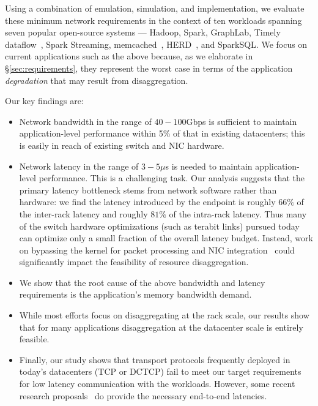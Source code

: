 Using a combination of emulation, simulation, and implementation, we evaluate these minimum network requirements in the context of ten workloads spanning seven popular open-source systems --- Hadoop, Spark, GraphLab, Timely dataflow~\cite{timely-dataflow, timely-dataflow1}, Spark Streaming, memcached~\cite{memcached}, HERD~\cite{herd}, and SparkSQL\@. 
We focus on current applications such as the above because, as we elaborate in \S\ref{sec:requirements}, they represent the worst case in terms of the application \emph{degradation} that may result from disaggregation. 

\noindent Our key findings are:
\vspace{-0.5em}
\begin{itemize}[leftmargin=*]
\itemsep0em
	\item Network bandwidth in the range of $40-100$Gbps is sufficient to maintain application-level performance within 5\% of that in existing datacenters; this is easily in reach of existing switch and NIC hardware. 
	\item Network latency in the range of $3-5\mu$s is needed to maintain application-level performance. This is a challenging task. Our analysis suggests that the primary latency bottleneck stems from  network software rather than hardware: we find the latency introduced by the endpoint is roughly $66\%$ of the inter-rack latency and roughly $81\%$ of the intra-rack latency. 
	Thus many of the switch hardware optimizations (such as terabit links) pursued today can optimize only a small fraction of the overall latency budget.
	Instead, work on bypassing the kernel for packet processing and NIC integration~\cite{cpu-nic} could significantly impact the feasibility of resource disaggregation.
	\item We show that the root cause of the above bandwidth and latency requirements is the application's memory bandwidth demand.
	\item While most efforts focus on disaggregating at the rack scale, our results show that for many applications disaggregation at the datacenter scale is entirely feasible.	
 	\item Finally, our study shows that transport protocols frequently deployed in today's datacenters (TCP or DCTCP) fail to meet our target requirements for low latency communication with the \dis workloads. However, some recent research proposals~\cite{pfabric, phost} do provide the necessary end-to-end latencies. 
\end{itemize} 

